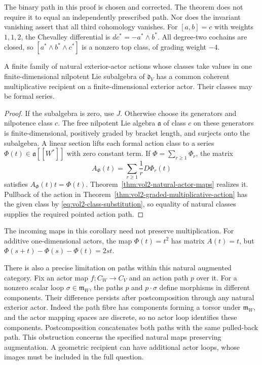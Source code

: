 The binary path in this proof is chosen and corrected. The
theorem does not require it to equal an independently prescribed
path. Nor does the invariant vanishing assert that all third
cohomology vanishes. For $[a,b]=c$ with weights $1,1,2$,
the Chevalley differential is $dc^*=-a^*\wedge b^*$.
All degree-two cochains are closed, so
$[a^*\wedge b^*\wedge c^*]$ is a nonzero top class,
of grading weight $-4$.

\begin{corollary}\label{cor:vol2-nilpotent-recipient}
A finite family of natural exterior-actor actions whose classes
take values in one finite-dimensional nilpotent Lie subalgebra
of $\mathfrak d_V$ has a common coherent multiplicative
recipient on a finite-dimensional exterior actor. Their
classes may be formal series.
\end{corollary}
\begin{proof}
If the subalgebra is zero, use $J$. Otherwise choose its
generators and nilpotence class $c$. The free nilpotent Lie
algebra $\mathfrak a$ of class $c$ on these generators is
finite-dimensional, positively graded by bracket length, and
surjects onto the subalgebra. A linear section lifts each
formal action class to a series $\Phi(t)\in\mathfrak a[[W^*]]$
with zero constant term. If $\Phi=\sum_{r\geq1}\Phi_r$,
the matrix
\[
 A_\Phi(t)=\sum_{r\geq1}\frac1rD\Phi_r(t)
\]
satisfies $A_\Phi(t)t=\Phi(t)$. Theorem~\ref{thm:vol2-natural-actor-maps}
realizes it. Pullback of the action in
Theorem~\ref{thm:vol2-graded-multiplicative-action} has the
given class by \eqref{eq:vol2-class-substitution}, so equality
of natural classes supplies the required pointed action path.
\end{proof}

The incoming maps in this corollary need not preserve
multiplication. For additive one-dimensional actors, the
map $\Phi(t)=t^2$ has matrix $A(t)=t$, but
$\Phi(s+t)-\Phi(s)-\Phi(t)=2st$.

There is also a precise limitation on paths within this
natural augmented category. Fix an actor map $f:C_W\to C_V$
and an action path $p$ over it. For a nonzero scalar loop
$\sigma\in\mathfrak m_W$, the paths $p$ and $p\cdot\sigma$
define morphisms in different components. Their difference
persists after postcomposition through any natural exterior
actor. Indeed the path fibre has components forming a torsor
under $\mathfrak m_W$, and the actor mapping spaces are
discrete, so no actor loop identifies these components.
Postcomposition concatenates both paths with the same
pulled-back path. This obstruction concerns the specified
natural maps preserving augmentation. A geometric recipient
can have additional actor loops, whose images must be included
in the full question.

